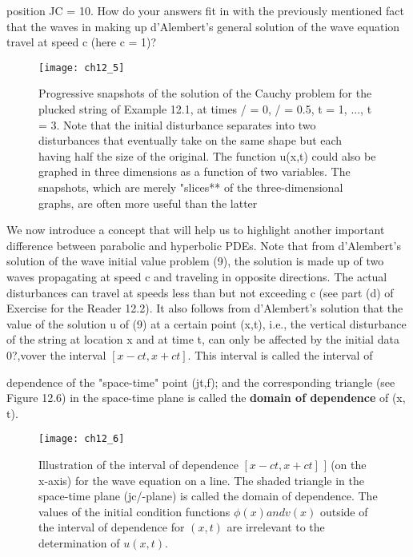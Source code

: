 \documentclass[../main.tex]{subfiles}
\begin{document}
position JC = 10. How do your answers fit in with the previously mentioned fact
that the waves in making up d'Alembert's general solution of the wave equation
travel at speed c (here c = 1)? 
\begin{figure}[H]
	\centering
	\texttt{[image: ch12\_5]}
	\caption{\textsf{ Progressive snapshots of the solution of the Cauchy problem for the
plucked string of Example 12.1, at times / = 0, / = 0.5, t = 1, ..., t = 3. Note that the initial
disturbance separates into two disturbances that eventually take on the same shape but each
having half the size of the original. The function u(x,t) could also be graphed in three
dimensions as a function of two variables. The snapshots, which are merely "slices** of the
three-dimensional graphs, are often more useful than the latter}}
	\label{pfig:ch12_5}
\end{figure}
We now introduce a concept that will help us to highlight another important
difference between parabolic and hyperbolic PDEs. Note that from d'Alembert's
solution of the wave initial value problem (9), the solution is made up of two
waves propagating at speed c and traveling in opposite directions. The actual
disturbances can travel at speeds less than but not exceeding c (see part (d) of
Exercise for the Reader 12.2). It also follows from d'Alembert's solution that the
value of the solution u of (9) at a certain point (x,t), i.e., the vertical disturbance of
the string at location x and at time t, can only be affected by the initial data
0?,vover the interval $[x-ct,x + ct]$. This interval is called the interval of 

 dependence of the "space-time" point (jt,f); and the corresponding triangle (see
Figure 12.6) in the space-time plane is called the \textbf{domain of dependence} of (x, t).
\begin{figure}[H]
	\centering
	\texttt{[image: ch12\_6]}
	\caption{\textsf{  Illustration of the interval of dependence $[x-ct, x+ct]$ ] (on the x-axis)
for the wave equation on a line. The shaded triangle in the space-time plane (jc/-plane) is
called the domain of dependence. The values of the initial condition functions $\phi(x) and v(x)$ outside of the interval of dependence for $(x,t)$ are irrelevant to the
determination of $u(x,t)$. 
}}
	\label{pfig:ch12_6}
\end{figure}
\end{document}
